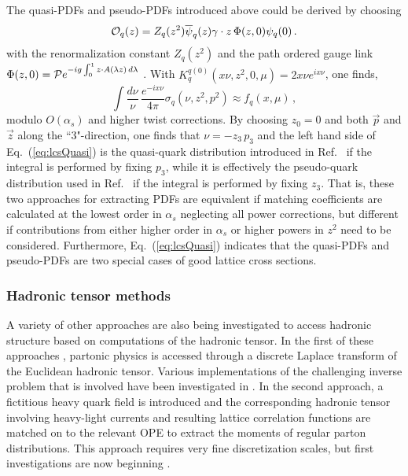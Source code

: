 The quasi-PDFs and pseudo-PDFs introduced above could be derived by choosing 
\begin{equation}
{\cal O}_{q}(z)=Z_q(z^2)\overline{\psi}_q(z)\gamma\cdot {z}\, \Phi(z,0){\psi}_q(0)\,.
\end{equation}
 with the renormalization constant $Z_q(z^2)$ and the path ordered gauge link $\Phi(z,0)={\cal P}e^{-ig\int_0^{1} z\cdot A(\lambda z)\,d\lambda}$ \cite{Ma:2017pxb}.  With $K^{q(0)}_{q}(x \nu,z^2,0,\mu)= 2 x \nu  e^{i x \nu}$, one finds,
\begin{equation}\label{eq:lcsQuasi}
\int \frac{d \nu}{\nu}\, \frac{e^{-i x \nu}}{4\pi} \sigma_{q}(\nu,z^2,p^2)\approx f_{q}(x,\mu)\, ,
\end{equation}
modulo $O(\alpha_s)$ and higher twist corrections.  By choosing $z_0=0$ and both $\vec{p}$ and $\vec{z}$ along the ``3"-direction, one finds that $\nu=-z_3\, p_3$ and the left hand side of Eq.~(\ref{eq:lcsQuasi}) is the quasi-quark distribution introduced in Ref.~\cite{Ji:2013dva} if the integral is performed by fixing $p_3$, while it is effectively the pseudo-quark distribution used in Ref.~\cite{Orginos:2017kos} if the integral is performed by fixing $z_3$. That is, these two approaches for extracting PDFs are equivalent if matching coefficients are calculated at the lowest order in $\alpha_s$ neglecting all power corrections, but different if contributions from either higher order in $\alpha_s$ or higher powers in $z^2$ need to be considered.
Furthermore, Eq.~(\ref{eq:lcsQuasi}) indicates that the quasi-PDFs and pseudo-PDFs are two special cases of good lattice cross sections. 

\subsubsection{Hadronic tensor methods}


A variety of other approaches are also being investigated to access hadronic structure \cite{Liu:1993cv,Aglietti:1998mz,Detmold:2005gg,Liu:2016djw} based on computations of the hadronic tensor. In the first of these approaches \cite{Liu:1993cv,Liu:2016djw}, partonic physics is accessed through a discrete Laplace transform of the Euclidean hadronic tensor. Various implementations of the challenging inverse problem that is involved have been investigated in \cite{Liang:2017mye}. In the second approach, a fictitious heavy quark field is introduced and the corresponding hadronic tensor involving heavy-light currents and resulting lattice correlation functions are matched on to the relevant OPE to extract the moments of regular parton distributions. This approach requires very fine discretization scales, but first investigations are now beginning \cite{Detmold:2018kwu}. 



